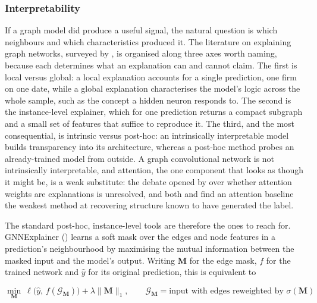 \subsubsection{Interpretability}\label{sec_gnn_interp}

If a graph model did produce a useful signal, the natural question is which neighbours and which characteristics produced it. The literature on explaining graph networks, surveyed by \cite{yuan2023explainability}, is organised along three axes worth naming, because each determines what an explanation can and cannot claim. The first is local versus global: a local explanation accounts for a single prediction, one firm on one date, while a global explanation characterises the model's logic across the whole sample, such as the concept a hidden neuron responds to. The second is the instance-level explainer, which for one prediction returns a compact subgraph and a small set of features that suffice to reproduce it. The third, and the most consequential, is intrinsic versus post-hoc: an intrinsically interpretable model builds transparency into its architecture, whereas a post-hoc method probes an already-trained model from outside. A graph convolutional network is not intrinsically interpretable, and attention, the one component that looks as though it might be, is a weak substitute: the debate opened by \cite{jain2019attention} over whether attention weights are explanations is unresolved, and both \cite{ying2019gnnexplainer} and \cite{luo2020parameterized} find an attention baseline the weakest method at recovering structure known to have generated the label.

The standard post-hoc, instance-level tools are therefore the ones to reach for. GNNExplainer (\cite{ying2019gnnexplainer}) learns a soft mask over the edges and node features in a prediction's neighbourhood by maximising the mutual information between the masked input and the model's output. Writing $\mathbf{M}$ for the edge mask, $f$ for the trained network and $\hat{y}$ for its original prediction, this is equivalent to

\begin{equation}
\label{eq_gnn_8}
\min_{\mathbf{M}}\ \ell\big(\hat{y},\, f(\mathcal{G}_{\mathbf{M}})\big) + \lambda \lVert \mathbf{M} \rVert_1, \qquad \mathcal{G}_{\mathbf{M}} = \text{input with edges reweighted by } \sigma(\mathbf{M})
\end{equation}

